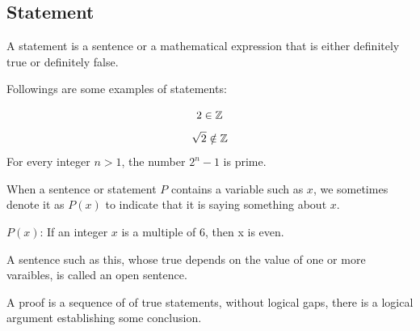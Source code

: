 \subsection{Statement}
\begin{definition}
    [Statement] A statement is a sentence or a mathematical expression that is either definitely true or definitely false. 
\end{definition}
Followings are some examples of statements:

\begin{example}
    $$2 \in \mathbb{Z}$$
    $$\sqrt{2} \notin \mathbb{Z}$$
    For every integer $n > 1$, the number $2^n - 1$ is prime. 
\end{example}

When a sentence or statement $P$ contains a variable such as $x$, we sometimes denote it as $P(x)$ to indicate that it 
is saying something about $x$.

\begin{example}
    $P(x)$: If an integer $x$ is a multiple of 6, then x is even. 
\end{example}

\begin{definition}
    A sentence such as this, whose true depends on the value of one or more varaibles, is called an open sentence. 
\end{definition}

\begin{definition}
    [Proof]
    A proof is a sequence of of true statements, without logical gaps, there is a logical argument establishing some conclusion. 
\end{definition}

\newpage